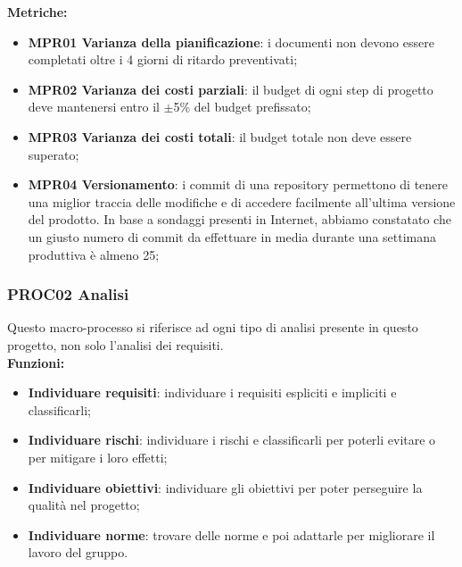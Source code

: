 \documentclass[../piano_di_qualifica.tex]{subfiles}
\begin{document}
\textbf{Metriche:}
\smallbreak
\begin{itemize}
	\item \textbf{MPR01 Varianza della pianificazione}: i documenti non devono essere completati oltre i 4 giorni di ritardo preventivati;
	\item \textbf{MPR02 Varianza dei costi parziali}: il budget di ogni step di progetto deve mantenersi entro il $\pm$5\% del budget prefissato;
	\item \textbf{MPR03 Varianza dei costi totali}: il budget totale non deve essere superato;
	\item \textbf{MPR04 Versionamento}: i commit di una repository permettono di tenere una miglior traccia delle modifiche e di accedere facilmente all’ultima versione del prodotto. In base a sondaggi presenti in Internet, abbiamo constatato che un giusto numero di commit da effettuare in media durante una settimana produttiva è almeno 25;
\end{itemize}

\subsubsection{PROC02 Analisi}
Questo macro-processo si riferisce ad ogni tipo di analisi presente in questo progetto, non solo l'analisi dei requisiti.\\

\textbf{Funzioni:}
\smallbreak
\begin{itemize}
	\item \textbf{Individuare requisiti}: individuare i requisiti espliciti e impliciti e classificarli;
	\item \textbf{Individuare rischi}: individuare i rischi e classificarli per poterli evitare o per mitigare i loro effetti;
	\item \textbf{Individuare obiettivi}: individuare gli obiettivi per poter perseguire la qualità nel progetto;
	\item \textbf{Individuare norme}: trovare delle norme e poi adattarle per migliorare il lavoro del gruppo.
\end{itemize}
\end{document}

